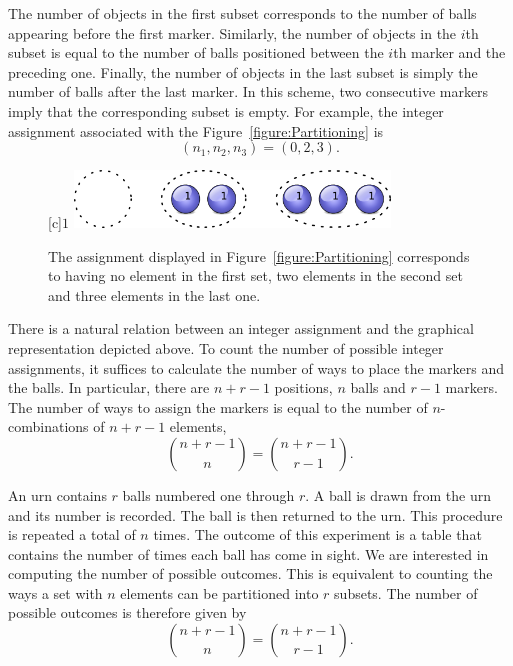 The number of objects in the first subset corresponds to the number of balls appearing before the first marker.
Similarly, the number of objects in the $i$th subset is equal to the number of balls positioned between the $i$th marker and the preceding one.
Finally, the number of objects in the last subset is simply the number of balls after the last marker.
In this scheme, two consecutive markers imply that the corresponding subset is empty.
For example, the integer assignment associated with the Figure~\ref{figure:Partitioning} is
\begin{equation*}
(n_1, n_2, n_3) = (0,2,3).
\end{equation*}

\begin{figure}[htb!]
\begin{center}
\begin{psfrags}
[c]{$1$}
\includegraphics[height=1.53cm]{Figures/4Chapter/partitioning2}
\end{psfrags}
\caption{The assignment displayed in Figure~\ref{figure:Partitioning} corresponds to having no element in the first set, two elements in the second set and three elements in the last one.}
\label{figure:Partitioning2}
\end{center}
\end{figure}

There is a natural relation between an integer assignment and the graphical representation depicted above.
To count the number of possible integer assignments, it suffices to calculate the number of ways to place the markers and the balls.
In particular, there are $n + r - 1$ positions, $n$ balls and $r - 1$ markers.
The number of ways to assign the markers is equal to the number of $n$-combinations of $n + r - 1$ elements,
\begin{equation*}
\binom{n + r - 1}{n} = \binom{n + r - 1}{r - 1} .
\end{equation*}

\begin{example}
An urn contains $r$ balls numbered one through $r$.
A ball is drawn from the urn and its number is recorded.
The ball is then returned to the urn.
This procedure is repeated a total of $n$ times.
The outcome of this experiment is a table that contains the number of times each ball has come in sight.
We are interested in computing the number of possible outcomes.
This is equivalent to counting the ways a set with $n$ elements can be partitioned into $r$ subsets.
The number of possible outcomes is therefore given by
\begin{equation*}
\binom{n + r - 1}{n} = \binom{n + r - 1}{r - 1} .
\end{equation*}
\end{example}


